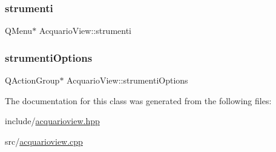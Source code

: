 \mbox{\label{classAcquarioView_af3886eb0647eaaff7412fec6ba751d9c_af3886eb0647eaaff7412fec6ba751d9c}} 
\subsubsection{\texorpdfstring{strumenti}{strumenti}}
{\footnotesize\ttfamily Q\+Menu$\ast$ Acquario\+View\+::strumenti\hspace{0.3cm}{\ttfamily [private]}}

\mbox{\label{classAcquarioView_a254259de7a6667b127571170f362506f_a254259de7a6667b127571170f362506f}} 
\subsubsection{\texorpdfstring{strumenti\+Options}{strumentiOptions}}
{\footnotesize\ttfamily Q\+Action\+Group$\ast$ Acquario\+View\+::strumenti\+Options\hspace{0.3cm}{\ttfamily [private]}}



The documentation for this class was generated from the following files\+:\begin{DoxyCompactItemize}
\item 
include/\hyperlink{acquarioview_8hpp}{acquarioview.\+hpp}\item 
src/\hyperlink{acquarioview_8cpp}{acquarioview.\+cpp}\end{DoxyCompactItemize}
